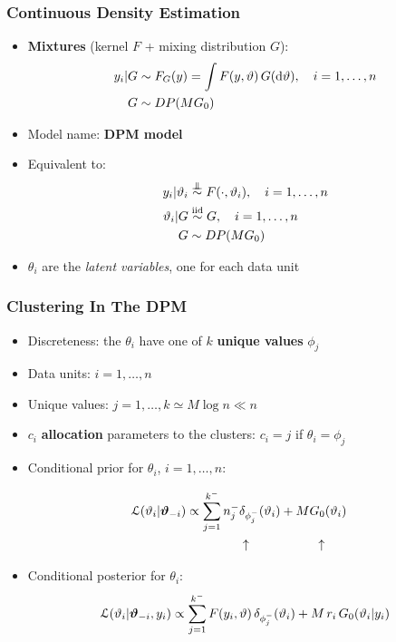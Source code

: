 \begin{frame}
	\frametitle{Continuous Density Estimation}
	\begin{itemize}
		\item \textbf{Mixtures} (kernel $F$ + mixing distribution $G$):
		\begin{align*}
			y_i | G &\sim F_G(y) = \int F(y,\vartheta) \, G(\mathrm d\vartheta), \quad i=1,\dots,n \\
			G &\sim DP(M G_0)
		\end{align*}
		\vspace{-10pt}
		\item Model name: \textbf{DPM model}
		\item Equivalent to:
		\begin{align*}
			y_i | \theta_i &\indsim F(\cdot,\theta_i), \quad i=1,\dots,n \\
			\theta_i | G &\iidsim G, \quad i=1,\dots,n \\
			G &\sim DP(M G_0)
		\end{align*}
		\item $\theta_i$ are the \textit{latent variables}, one for each data unit
	\end{itemize}
\end{frame}


\begin{frame}
	\frametitle{Clustering In The DPM}
	\begin{itemize}
		\item Discreteness: the $\theta_i$ have one of $k$ \textbf{unique values} $\phi_j$ %
		\item Data units: $i=1,\dots,n$ \\
		\item Unique values: $j=1,\dots,k \simeq M \log n \ll n$
		\item $c_i$ \textbf{allocation} parameters to the clusters: $c_i = j$ if $\theta_i = \phi_j$
		\pause
		\item Conditional prior for $\theta_i$, $i=1,\dots,n$:
		\vspace{-5pt}
			\begin{minipage}{0.3\textwidth}
				\begin{align*}
					\hspace{-10pt}
					\Lc(\theta_i | \boldsymbol\theta_{-i}) \propto
					\sum_{j=1}^{k^-} n^-_j &\delta_{\phi^-_j} (\theta_i) + M G_0 (\theta_i) \\
					&\uparrow \hspace{55pt} \uparrow
				\end{align*}
			\end{minipage}%
			\begin{minipage}{0.5\textwidth}
				
			\end{minipage}
		\vspace{-5pt}
		\item Conditional posterior for $\theta_i$:
		$$ \mathcal L(\vartheta_i | \boldsymbol{\vartheta}_{-i}, y_i) \propto
		\sum_{j=1}^{k^-} F(y_i,\vartheta) \, \delta_{\phi^-_j} (\vartheta_i) + M \, r_i \, G_0(\vartheta_i | y_i) $$ %
	\end{itemize}
\end{frame}


